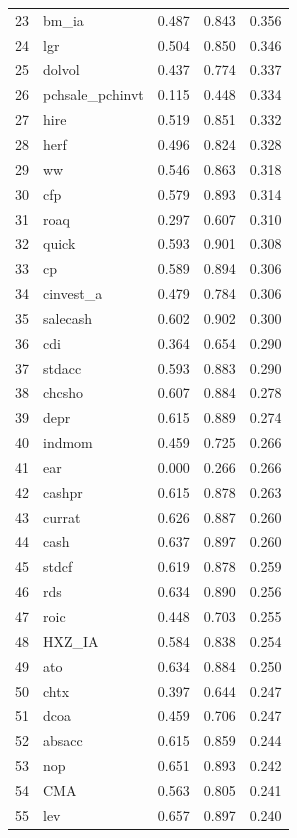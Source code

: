 \documentclass[12pt]{article}
\begin{document}
\begin{footnotesize}
\begin{longtable}{rl|c|c|c}
		23 & bm\_ia & 0.487 & 0.843 & 0.356 \\ 
		24 & lgr & 0.504 & 0.850 & 0.346 \\ 
		25 & dolvol & 0.437 & 0.774 & 0.337 \\ 
		26 & pchsale\_pchinvt & 0.115 & 0.448 & 0.334 \\ 
		27 & hire & 0.519 & 0.851 & 0.332 \\ 
		28 & herf & 0.496 & 0.824 & 0.328 \\ 
		29 & ww & 0.546 & 0.863 & 0.318 \\ 
		30 & cfp & 0.579 & 0.893 & 0.314 \\ 
		31 & roaq & 0.297 & 0.607 & 0.310 \\ 
		32 & quick & 0.593 & 0.901 & 0.308 \\ 
		33 & cp & 0.589 & 0.894 & 0.306 \\ 
		34 & cinvest\_a & 0.479 & 0.784 & 0.306 \\ 
		35 & salecash & 0.602 & 0.902 & 0.300 \\ 
		36 & cdi & 0.364 & 0.654 & 0.290 \\ 
		37 & stdacc & 0.593 & 0.883 & 0.290 \\ 
		38 & chcsho & 0.607 & 0.884 & 0.278 \\ 
		39 & depr & 0.615 & 0.889 & 0.274 \\ 
		40 & indmom & 0.459 & 0.725 & 0.266 \\ 
		41 & ear & 0.000 & 0.266 & 0.266 \\ 
		42 & cashpr & 0.615 & 0.878 & 0.263 \\ 
		43 & currat & 0.626 & 0.887 & 0.260 \\ 
		44 & cash & 0.637 & 0.897 & 0.260 \\ 
		45 & stdcf & 0.619 & 0.878 & 0.259 \\ 
		46 & rds & 0.634 & 0.890 & 0.256 \\ 
		47 & roic & 0.448 & 0.703 & 0.255 \\ 
		48 & HXZ\_IA & 0.584 & 0.838 & 0.254 \\ 
		49 & ato & 0.634 & 0.884 & 0.250 \\ 
		50 & chtx & 0.397 & 0.644 & 0.247 \\ 
		51 & dcoa & 0.459 & 0.706 & 0.247 \\ 
		52 & absacc & 0.615 & 0.859 & 0.244 \\ 
		53 & nop & 0.651 & 0.893 & 0.242 \\ 
		54 & CMA & 0.563 & 0.805 & 0.241 \\ 
		55 & lev & 0.657 & 0.897 & 0.240 \\ 

\end{longtable}
\end{footnotesize}
\end{document}
